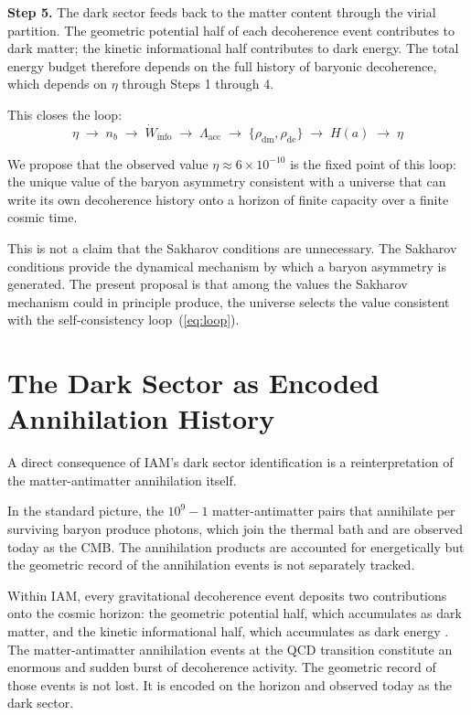 \documentclass[12pt,a4paper]{article}
\begin{document}
\textbf{Step 5.} The dark sector feeds back to the matter content
through the virial partition. The geometric potential half of each
decoherence event contributes to dark matter; the kinetic informational
half contributes to dark energy. The total energy budget therefore
depends on the full history of baryonic decoherence, which depends on
$\eta$ through Steps 1 through 4.

This closes the loop:
\begin{equation}
\eta \;\longrightarrow\; n_b \;\longrightarrow\;
\dot{W}_\mathrm{info} \;\longrightarrow\;
\Lambda_\mathrm{acc} \;\longrightarrow\;
\{\rho_\mathrm{dm}, \rho_\mathrm{de}\} \;\longrightarrow\;
H(a) \;\longrightarrow\; \eta
\label{eq:loop}
\end{equation}

We propose that the observed value $\eta \approx 6 \times 10^{-10}$ is
the fixed point of this loop: the unique value of the baryon asymmetry
consistent with a universe that can write its own decoherence history
onto a horizon of finite capacity over a finite cosmic time.

This is not a claim that the Sakharov conditions are unnecessary. The
Sakharov conditions provide the dynamical mechanism by which a baryon
asymmetry is generated. The present proposal is that among the values
the Sakharov mechanism could in principle produce, the universe selects
the value consistent with the self-consistency loop~(\ref{eq:loop}).

\section{The Dark Sector as Encoded Annihilation History}
\label{sec:darksector}

A direct consequence of IAM's dark sector identification is a
reinterpretation of the matter-antimatter annihilation itself.

In the standard picture, the $10^9 - 1$ matter-antimatter pairs that
annihilate per surviving baryon produce photons, which join the thermal
bath and are observed today as the CMB. The annihilation products are
accounted for energetically but the geometric record of the annihilation
events is not separately tracked.

Within IAM, every gravitational decoherence event deposits two
contributions onto the cosmic horizon: the geometric potential half,
which accumulates as dark matter, and the kinetic informational half,
which accumulates as dark energy \citep{mahaffey2026_virial_dm}. The
matter-antimatter annihilation events at the QCD transition constitute
an enormous and sudden burst of decoherence activity. The geometric
record of those events is not lost. It is encoded on the horizon and
observed today as the dark sector.
\end{document}
